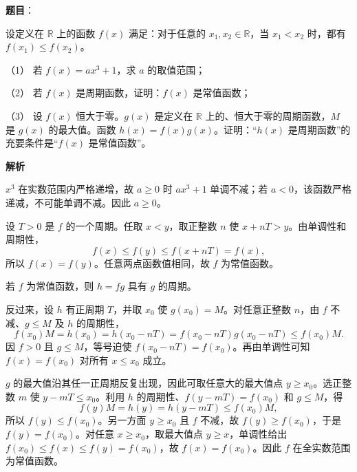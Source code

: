 \begin{answer}

\textbf{题目}：

设定义在 $\mathbb R$ 上的函数 $f(x)$ 满足：对于任意的 $x_1,x_2\in\mathbb R$，当 $x_1<x_2$ 时，都有 $f(x_1)\leqslant f(x_2)$。

（1） 若 $f(x)=ax^3+1$，求 $a$ 的取值范围；

（2） 若 $f(x)$ 是周期函数，证明：$f(x)$ 是常值函数；

（3） 设 $f(x)$ 恒大于零。$g(x)$ 是定义在 $\mathbb R$ 上的、恒大于零的周期函数，$M$ 是 $g(x)$ 的最大值。函数 $h(x)=f(x)g(x)$。证明：“$h(x)$ 是周期函数”的充要条件是“$f(x)$ 是常值函数”。

\textbf{解析}


$x^3$ 在实数范围内严格递增，故 $a\geqslant0$ 时 $ax^3+1$ 单调不减；若 $a<0$，该函数严格递减，不可能单调不减。因此 $a\geqslant0$。


设 $T>0$ 是 $f$ 的一个周期。任取 $x<y$，取正整数 $n$ 使 $x+nT>y$。由单调性和周期性，
\nopagebreak[4]
\[
f(x)\leqslant f(y)\leqslant f(x+nT)=f(x),
\]
所以 $f(x)=f(y)$。任意两点函数值相同，故 $f$ 为常值函数。


若 $f$ 为常值函数，则 $h=fg$ 具有 $g$ 的周期。

反过来，设 $h$ 有正周期 $T$，并取 $x_0$ 使 $g(x_0)=M$。对任意正整数 $n$，由 $f$ 不减、$g\leqslant M$ 及 $h$ 的周期性，
\nopagebreak[4]
\[
f(x_0)M=h(x_0)=h(x_0-nT)=f(x_0-nT)g(x_0-nT)\leqslant f(x_0)M.
\]
因 $f>0$ 且 $g\leqslant M$，等号迫使 $f(x_0-nT)=f(x_0)$。再由单调性可知 $f(x)=f(x_0)$ 对所有 $x\leqslant x_0$ 成立。

$g$ 的最大值沿其任一正周期反复出现，因此可取任意大的最大值点 $y\geqslant x_0$。选正整数 $m$ 使 $y-mT\leqslant x_0$。利用 $h$ 的周期性、$f(y-mT)=f(x_0)$ 和 $g\leqslant M$，得
\nopagebreak[4]
\[
f(y)M=h(y)=h(y-mT)\leqslant f(x_0)M,
\]
所以 $f(y)\leqslant f(x_0)$。另一方面 $y\geqslant x_0$ 且 $f$ 不减，故 $f(y)\geqslant f(x_0)$，于是 $f(y)=f(x_0)$。对任意 $x\geqslant x_0$，取最大值点 $y\geqslant x$，单调性给出 $f(x_0)\leqslant f(x)\leqslant f(y)=f(x_0)$，故 $f(x)=f(x_0)$。因此 $f$ 在全实数范围为常值函数。




\end{answer}